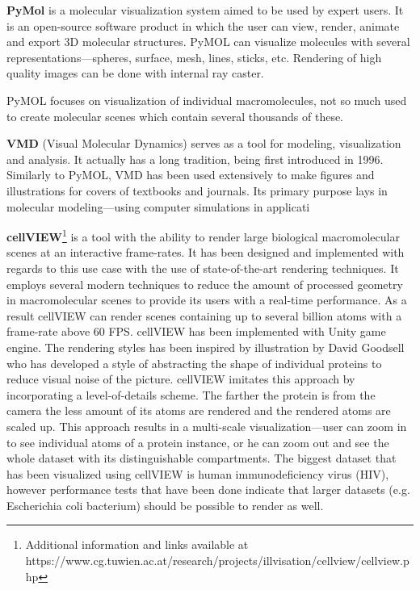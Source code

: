 \documentclass[
  digital, %
  table,   %
  nolof,     %
  nolot,     %
]{fithesis3}
\begin{document}

\textbf{PyMol}\cite{PyMOL} is a molecular visualization system aimed to be used by expert users. It is an open-source software product in which the user can view, render, animate and export 3D molecular structures. PyMOL can visualize molecules with several representations—spheres, surface, mesh, lines, sticks, etc. Rendering of high quality images can be done with internal ray caster.

PyMOL focuses on visualization of individual macromolecules, not so much used to create molecular scenes which contain several thousands of these.

\textbf{VMD} (Visual Molecular Dynamics)\cite{HUMP96} serves as a tool for modeling, visualization and analysis. It actually has a long tradition, being first introduced in 1996. Similarly to PyMOL, VMD has been used extensively to make figures and illustrations for covers of textbooks and journals. Its primary purpose lays in molecular modeling—using computer simulations in applicati

\textbf{cellVIEW}\footnote{Additional information and links available at https://www.cg.tuwien.ac.at/research/projects/illvisation/cellview/cellview.php}\cite{cellVIEW_2015} is a tool with the ability to render large biological macromolecular scenes at an interactive frame-rates. It has been designed and implemented with regards to this use case with the use of state-of-the-art rendering techniques. It employs several modern techniques to reduce the amount of processed geometry in macromolecular scenes to provide its users with a real-time performance. As a result cellVIEW can render scenes containing up to several billion atoms with a frame-rate above 60 FPS. cellVIEW has been implemented with Unity game engine. The rendering styles has been inspired by illustration by David Goodsell who has developed a style of abstracting the shape of individual proteins to reduce visual noise of the picture. cellVIEW imitates this approach by incorporating a level-of-details scheme. The farther the protein is from the camera the less amount of its atoms are rendered and the rendered atoms are scaled up. This approach results in a multi-scale visualization—user can zoom in to see individual atoms of a protein instance, or he can zoom out and see the whole dataset with its distinguishable compartments. The biggest dataset that has been visualized using cellVIEW is human immunodeficiency virus (HIV), however performance tests that have been done indicate that larger datasets (e.g. Escherichia coli bacterium) should be possible to render as well.
\end{document}
